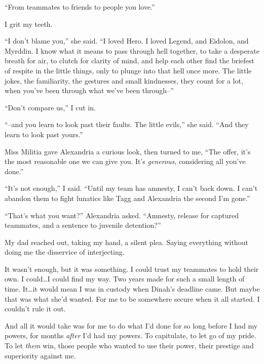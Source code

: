 ``From teammates to friends to people you love.''



I grit my teeth.



``I don't blame you,'' she said.  ``I loved Hero.  I loved Legend, and Eidolon, and Myrddin.  I know what it means to pass through hell together, to take a desperate breath for air, to clutch for clarity of mind, and help each other find the briefest of respite in the little things, only to plunge into that hell once more.  The little jokes, the familiarity, the gestures and small kindnesses, they count for a lot, when you've been through what we've been through--''



``Don't compare us,'' I cut in.



``--and you learn to look past their faults.  The little evils,'' she said.  ``And they learn to look past yours.''



Miss Militia gave Alexandria a curious look, then turned to me, ``The offer, it's the most reasonable one we can give you.  It's \emph{generous}, considering all you've done.''



``It's not enough,'' I said.  ``Until my team has amnesty, I can't back down.  I can't abandon them to fight lunatics like Tagg and Alexandria the second I'm gone.''



``That's what you want?'' Alexandria asked.  ``Amnesty, release for captured teammates, and a sentence to juvenile detention?''



My dad reached out, taking my hand, a silent plea.  Saying everything without doing me the disservice of interjecting.



It wasn't enough, but it was something.  I could trust my teammates to hold their own.  I could\ldots I could find my way.  Two years made for such a small length of time.  It\ldots it would mean I was in custody when Dinah's deadline came.  But maybe that was what she'd wanted.  For me to be somewhere secure when it all started.  I couldn't rule it out.



And all it would take was for me to do what I'd done for so long before I had my powers, for months \emph{after} I'd had my powers.  To capitulate, to let go of my pride.  To let \emph{them }win, those people who wanted to use their power, their prestige and superiority against me.



